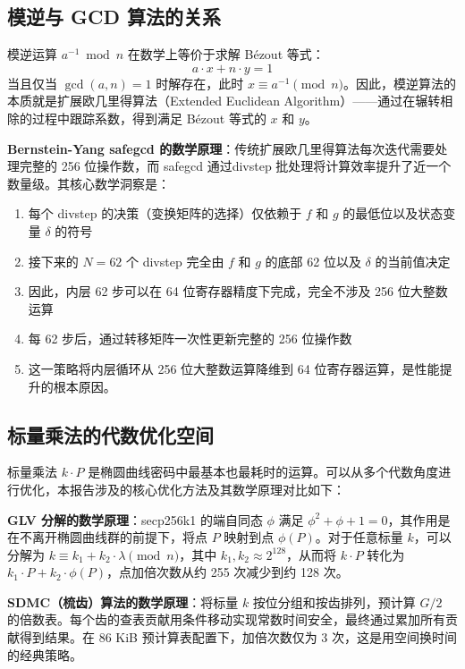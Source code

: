 \documentclass[a4paper,12pt]{ctexart}
\begin{document}
\subsection{模逆与 GCD 算法的关系}

模逆运算 $a^{-1} \bmod n$ 在数学上等价于求解 Bézout 等式：
\begin{equation}
a \cdot x + n \cdot y = 1
\end{equation}
当且仅当 $\gcd(a, n) = 1$ 时解存在，此时 $x \equiv a^{-1} \pmod{n}$。因此，模逆算法的本质就是扩展欧几里得算法（Extended Euclidean Algorithm）——通过在辗转相除的过程中跟踪系数，得到满足 Bézout 等式的 $x$ 和 $y$。

\textbf{Bernstein-Yang safegcd 的数学原理}：传统扩展欧几里得算法每次迭代需要处理完整的 256 位操作数，而 safegcd 通过divstep 批处理将计算效率提升了近一个数量级。其核心数学洞察是：

\begin{enumerate}[leftmargin=*]
  \item 每个 divstep 的决策（变换矩阵的选择）仅依赖于 $f$ 和 $g$ 的最低位以及状态变量 $\delta$ 的符号
  \item 接下来的 $N=62$ 个 divstep 完全由 $f$ 和 $g$ 的底部 62 位以及 $\delta$ 的当前值决定
  \item 因此，内层 62 步可以在 64 位寄存器精度下完成，完全不涉及 256 位大整数运算
  \item 每 62 步后，通过转移矩阵一次性更新完整的 256 位操作数
  \item 这一策略将内层循环从 256 位大整数运算降维到 64 位寄存器运算，是性能提升的根本原因。

\end{enumerate}


\subsection{标量乘法的代数优化空间}

标量乘法 $k \cdot P$ 是椭圆曲线密码中最基本也最耗时的运算。可以从多个代数角度进行优化，本报告涉及的核心优化方法及其数学原理对比如下：
 
\textbf{GLV 分解的数学原理}：secp256k1 的端自同态 $\phi$ 满足 $\phi^2 + \phi + 1 = 0$，其作用是在不离开椭圆曲线群的前提下，将点 $P$ 映射到点 $\phi(P)$。对于任意标量 $k$，可以分解为 $k \equiv k_1 + k_2 \cdot \lambda \pmod{n}$，其中 $k_1, k_2 \approx 2^{128}$，从而将 $k \cdot P$ 转化为 $k_1 \cdot P + k_2 \cdot \phi(P)$，点加倍次数从约 255 次减少到约 128 次。

\textbf{SDMC（梳齿）算法的数学原理}：将标量 $k$ 按位分组和按齿排列，预计算 $G/2$ 的倍数表。每个齿的查表贡献用条件移动实现常数时间安全，最终通过累加所有贡献得到结果。在 86 KiB 预计算表配置下，加倍次数仅为 3 次，这是用空间换时间的经典策略。
\end{document}
